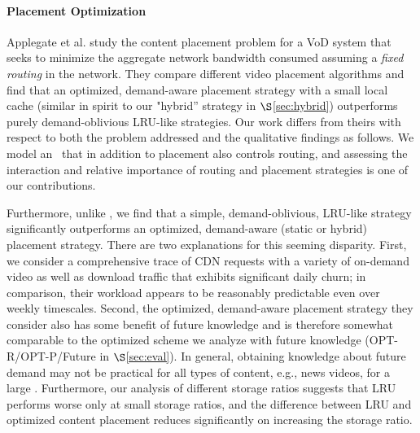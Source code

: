 {\paragraph{Placement Optimization}
Applegate et al. \cite{Applegate2010} study the content placement problem for a VoD system that seeks to minimize the aggregate network bandwidth consumed assuming a {\em fixed routing} in the network.  They  compare different video placement algorithms and find that an optimized, demand-aware placement strategy with a small local cache (similar in spirit to our "hybrid'' strategy in $\S$\ref{sec:hybrid}) outperforms purely demand-oblivious LRU-like strategies. Our work differs from theirs with respect to both the problem addressed and the qualitative findings as follows. We model an \ncp\ that in addition to placement also controls routing, and assessing the interaction and relative importance of routing and placement strategies is one of our contributions. 

Furthermore, unlike \cite{Applegate2010}, we find that a simple, demand-oblivious, LRU-like strategy significantly outperforms an optimized, demand-aware (static or hybrid) placement strategy. There are two explanations for this seeming disparity. First, we consider a comprehensive trace of CDN requests with a variety of on-demand video as well as download traffic that exhibits significant daily churn; in comparison, their workload appears to be reasonably predictable even over weekly timescales. Second, the optimized, demand-aware placement strategy they consider also has some benefit of future knowledge and is therefore somewhat comparable to the optimized scheme we analyze with future knowledge (OPT-R/OPT-P/Future in $\S$\ref{sec:eval}). In general, obtaining knowledge about future demand may not be practical for all types of content, e.g., news videos, for a large \ncp.  Furthermore, our analysis of different storage ratios suggests that LRU performs worse only at small storage ratios,  and the difference between  LRU and optimized content placement reduces significantly on increasing the storage ratio.




}
